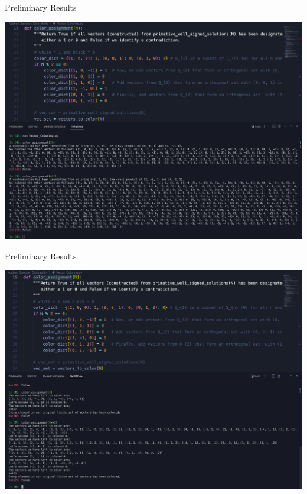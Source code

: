 \documentclass[11pt]{beamer}
\begin{document}
\begin{frame}{Preliminary Results}

\centering

\includegraphics[width=\textwidth]{Results 1}

\end{frame}
\begin{frame}{Preliminary Results}

\centering

\includegraphics[width=\textwidth]{Results 2}

\end{frame}
\end{document}
